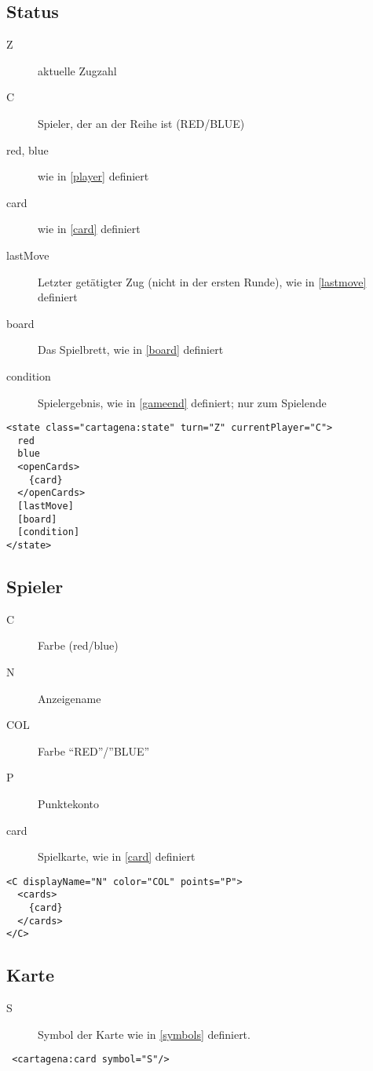 \documentclass[12pt,a4paper, ngerman, oneside]{scrartcl}
\begin{document}
\subsection{\label{state}Status}
\begin{description}
\item[Z] aktuelle Zugzahl
\item[C] Spieler, der an der Reihe ist (RED/BLUE)
\item[red, blue] wie in \ref{player} definiert
\item[card] wie in \ref{card} definiert
\item[lastMove] Letzter getätigter Zug (nicht in der ersten Runde), wie in
\ref{lastmove} definiert
\item[board] Das Spielbrett, wie in \ref{board} definiert
\item[condition] Spielergebnis, wie in \ref{gameend} definiert; nur zum Spielende
\end{description}
\begin{verbatim}
<state class="cartagena:state" turn="Z" currentPlayer="C">
  red
  blue
  <openCards>
    {card}
  </openCards>
  [lastMove]
  [board]
  [condition]
</state>

\end{verbatim}

\subsection{\label{player}Spieler}
\begin{description}
\item[C] Farbe (red/blue)
\item[N] Anzeigename
\item[COL] Farbe ``RED''/''BLUE''
\item[P] Punktekonto
\item[card] Spielkarte, wie in \ref{card} definiert
\end{description}
\begin{verbatim}
<C displayName="N" color="COL" points="P">
  <cards>
    {card}
  </cards>
</C>
\end{verbatim}


\subsection{\label{card}Karte}
\begin{description}
\item[S] Symbol der Karte wie in \ref{symbols} definiert.
\end{description}
\begin{verbatim} <cartagena:card symbol="S"/>
\end{verbatim}
\end{document}
